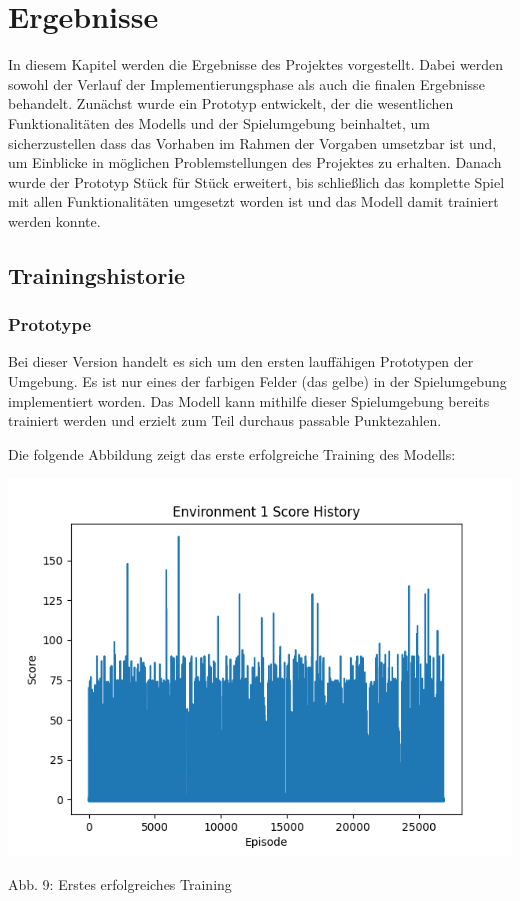 \section{Ergebnisse}
In diesem Kapitel werden die Ergebnisse des Projektes vorgestellt. Dabei werden sowohl der Verlauf der Implementierungsphase als auch die finalen Ergebnisse behandelt. Zunächst wurde ein Prototyp entwickelt, der die wesentlichen Funktionalitäten des Modells und der Spielumgebung beinhaltet, um sicherzustellen dass das Vorhaben im Rahmen der Vorgaben umsetzbar ist und, um Einblicke in möglichen Problemstellungen des Projektes zu erhalten. Danach wurde der Prototyp Stück für Stück erweitert, bis schließlich das komplette Spiel mit allen Funktionalitäten umgesetzt worden ist und das Modell damit trainiert werden konnte.
\subsection{Trainingshistorie}
\subsubsection{Prototype}
Bei dieser Version handelt es sich um den ersten lauffähigen Prototypen der Umgebung. Es ist nur eines der farbigen Felder (das gelbe) in der Spielumgebung implementiert worden. Das Modell kann mithilfe dieser Spielumgebung bereits trainiert werden und erzielt zum Teil durchaus passable Punktezahlen.

\begin{minipage}{\linewidth}
	Die folgende Abbildung zeigt das erste erfolgreiche Training des Modells:
	
	\vspace{0.5cm}
	\includegraphics[width=1\textwidth]{Bilder/firstpropertraining}
	
	Abb. 9: Erstes erfolgreiches Training\\
\end{minipage}


